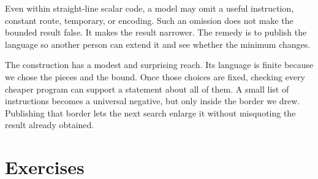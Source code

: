 Even within straight-line scalar code, a model may omit a useful instruction,
constant route, temporary, or encoding. Such an omission does not make the
bounded result false. It makes the result narrower. The remedy is to publish
the language so another person can extend it and see whether the minimum
changes.

The construction has a modest and surprising reach. Its language is finite
because we chose the pieces and the bound. Once those choices are
fixed, checking every cheaper program can support a statement about all of
them. A small list of instructions becomes a universal negative, but only
inside the border we drew.
Publishing that border lets the next search enlarge it without misquoting the
result already obtained.

\section{Exercises}

